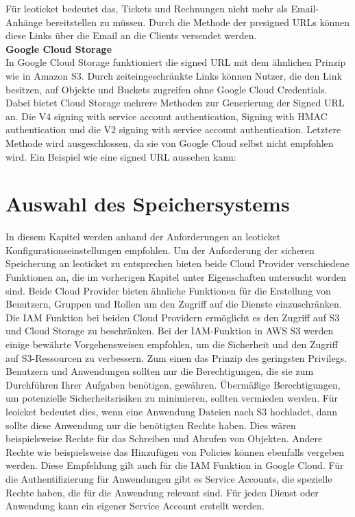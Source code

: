 Für leoticket bedeutet das, Tickets und Rechnungen nicht mehr als Email-Anhänge bereitstellen zu müssen. Durch die Methode der presigned URLs können diese Links über die Email an die Clients versendet werden.\\

\textbf{Google Cloud Storage}\\

In Google Cloud Storage funktioniert die signed URL mit dem ähnlichen Prinzip wie in Amazon S3. Durch zeiteingeschränkte Links können Nutzer, die den Link besitzen, auf Objekte und Buckets zugreifen ohne Google Cloud Credentials. Dabei bietet Cloud Storage mehrere Methoden zur Generierung der Signed URL an. Die V4 signing with service account authentication, Signing with HMAC authentication und die V2 signing with service account authentication. Letztere Methode wird ausgeschlossen, da sie von Google Cloud selbst nicht empfohlen wird. Ein Beispiel wie eine signed URL aussehen kann:

\newpage

\section{Auswahl des Speichersystems}

In diesem Kapitel werden anhand der Anforderungen an leoticket Konfigurationseinstellungen empfohlen. Um der Anforderung der sicheren Speicherung an leoticket zu entsprechen bieten beide Cloud Provider verschiedene Funktionen an, die im vorherigen Kapitel unter Eigenschaften untersucht worden sind. Beide Cloud Provider bieten ähnliche Funktionen für die Erstellung von Benutzern, Gruppen und Rollen um den Zugriff auf die Dienste einzuschränken. Die IAM Funktion bei beiden Cloud Providern ermöglicht es den Zugriff auf S3 und Cloud Storage zu beschränken. Bei der IAM-Funktion in AWS S3 werden einige bewährte Vorgehensweisen empfohlen, um die Sicherheit und den Zugriff auf S3-Ressourcen zu verbessern. Zum einen das Prinzip des geringsten Privilegs. Benutzern und Anwendungen sollten nur die Berechtigungen, die sie zum Durchführen Ihrer Aufgaben benötigen, gewähren. Übermäßige Berechtigungen, um potenzielle Sicherheitsrisiken zu minimieren, sollten vermieden werden. Für leoicket bedeutet dies, wenn eine Anwendung Dateien nach S3 hochladet, dann sollte diese Anwendung nur die benötigten Rechte haben. Dies wären beispielsweise Rechte für das Schreiben und Abrufen von Objekten. Andere Rechte wie beispielsweise das Hinzufügen von Policies können ebenfalls vergeben werden. Diese Empfehlung gilt auch für die IAM Funktion in Google Cloud. Für die Authentifizierung für Anwendungen gibt es Service Accounts, die spezielle Rechte haben, die für die Anwendung relevant sind. Für jeden Dienst oder Anwendung kann ein eigener Service Account erstellt werden.\\

